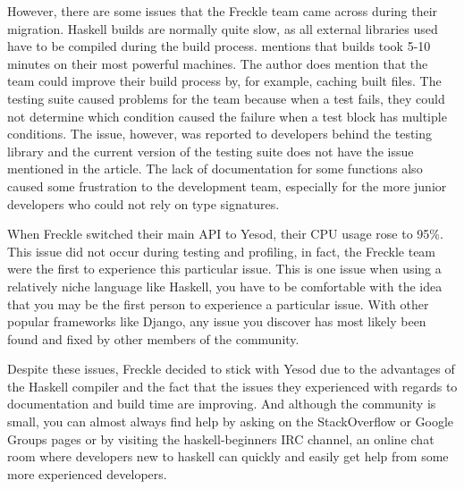 However, there are some issues that the Freckle team came across during their migration.
Haskell builds are normally quite slow, as all external libraries used have to be
compiled during the build process. \citeauthor{frontrow} mentions that builds took
5-10 minutes on their most powerful machines. The author does mention that the team
could improve their build process by, for example, caching built files. The testing
suite caused problems for the team because when a test fails, they could not determine
which condition caused the failure when a test block has multiple conditions. The issue,
however, was reported to developers behind the testing library and the current
version of the testing suite does not have the issue mentioned in the article. The
lack of documentation for some functions also caused some frustration to the development
team, especially for the more junior developers who could not rely on type signatures. \parencite{frontrow}

When Freckle switched their main API to Yesod, their CPU usage rose to 95\%. This issue
did not occur during testing and profiling, in fact, the Freckle team were the first to
experience this particular issue. This is one issue when using a relatively niche language
like Haskell, you have to be comfortable with the idea that you may be the first person
to experience a particular issue. With other popular frameworks like Django, any issue
you discover has most likely been found and fixed by other members of the community.

Despite these issues, Freckle decided to stick with Yesod due to the advantages of the
Haskell compiler and the fact that the issues they experienced with regards to documentation
and build time are improving. And although the community is small, you can almost
always find help by asking on the StackOverflow or Google Groups pages or by visiting
the haskell-beginners IRC channel, an online chat room where developers new to haskell
can quickly and easily get help from some more experienced developers.
